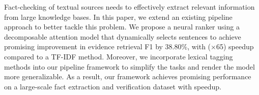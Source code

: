 Fact-checking of textual sources needs to effectively extract relevant information from large knowledge bases. In this paper, we extend an existing pipeline approach to better tackle this problem. We propose a neural ranker using a decomposable attention model that dynamically selects sentences to achieve promising improvement in evidence retrieval F1 by 38.80\%, with ($\times$65) speedup compared to a TF-IDF method. Moreover, we incorporate lexical tagging methods into our pipeline framework to simplify the tasks and render the model more generalizable. As a result, our framework achieves promising performance on a large-scale fact extraction and verification dataset with speedup.
